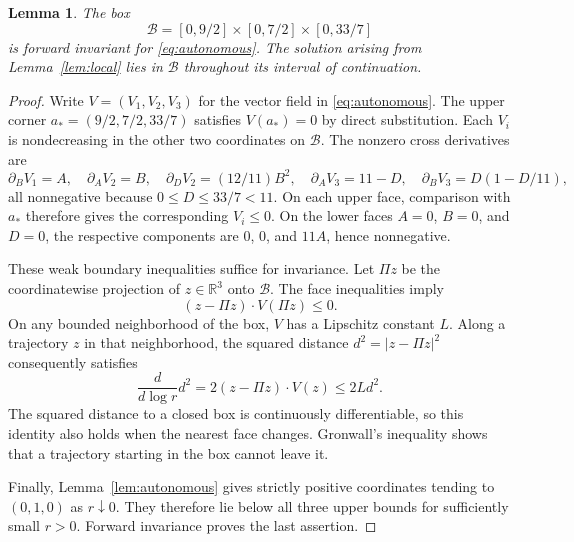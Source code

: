 \documentclass[11pt]{article}
\newcommand{\R}{\mathbb R}
\newtheorem{lemma}[theorem]{Lemma}
\theoremstyle{remark}
\begin{document}
\begin{lemma}\label{lem:box}
The box
\begin{equation}\label{eq:box}
 \mathcal B=[0,9/2]\times[0,7/2]\times[0,33/7]
\end{equation}
is forward invariant for \eqref{eq:autonomous}.
The solution arising from Lemma~\ref{lem:local} lies in
$\mathcal B$ throughout its interval of continuation.
\end{lemma}
\begin{proof}
Write $V=(V_1,V_2,V_3)$ for the vector field in
\eqref{eq:autonomous}.  The upper corner
$a_*=(9/2,7/2,33/7)$ satisfies $V(a_*)=0$ by direct substitution.
Each $V_i$ is nondecreasing in the other two coordinates on
$\mathcal B$.  The nonzero cross derivatives are
\[
 \partial_BV_1=A,\quad \partial_AV_2=B,\quad
 \partial_DV_2=(12/11)B^2,\quad
 \partial_AV_3=11-D,\quad
 \partial_BV_3=D(1-D/11),
\]
all nonnegative because $0\leq D\leq33/7<11$.
On each upper face, comparison with $a_*$ therefore gives
the corresponding $V_i\leq0$.
On the lower faces $A=0$, $B=0$, and $D=0$, the respective
components are $0$, $0$, and $11A$, hence nonnegative.

These weak boundary inequalities suffice for invariance.
Let $\Pi z$ be the coordinatewise projection of
$z\in\R^3$ onto $\mathcal B$.  The face inequalities imply
\[
 (z-\Pi z)\cdot V(\Pi z)\leq0.
\]
On any bounded neighborhood of the box, $V$ has a Lipschitz
constant $L$.  Along a trajectory $z$ in that neighborhood,
the squared distance $d^2=|z-\Pi z|^2$ consequently satisfies
\[
 \frac{d}{d\log r}d^2
 =2(z-\Pi z)\cdot V(z)\leq2L d^2.
\]
The squared distance to a closed box is continuously differentiable,
so this identity also holds when the nearest face changes.
Gronwall's inequality shows that a trajectory starting in the box
cannot leave it.

Finally, Lemma~\ref{lem:autonomous} gives strictly positive
coordinates tending to $(0,1,0)$ as $r\downarrow0$.
They therefore lie below all three upper bounds for sufficiently
small $r>0$.  Forward invariance proves the last assertion.
\end{proof}
\end{document}
